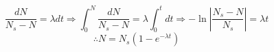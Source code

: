 \item

\[
	\frac{dN}{N_s - N} = \lambda dt
	\Rightarrow \int_{0}^{N} \frac{dN}{N_s - N} = \lambda \int_{0}^{t} dt
	\Rightarrow -\ln \left| \frac{N_s - N}{N_s} \right| = \lambda t
\]
\[
	\therefore N = N_s \left( 1 - e^{-\lambda t} \right)
\]